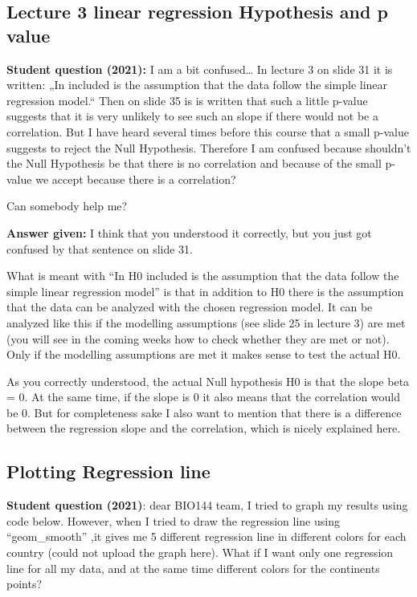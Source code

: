 \documentclass[
  letterpaper,
  8pt,
  a4paper]{book}
\begin{document}
\subsection*{Lecture 3 linear regression Hypothesis and p
value}\label{lecture-3-linear-regression-hypothesis-and-p-value}

\textbf{Student question (2021):} I am a bit confused\ldots{} In lecture
3 on slide 31 it is written: „In included is the assumption that the
data follow the simple linear regression model.`` Then on slide 35 is is
written that such a little p-value suggests that it is very unlikely to
see such an slope if there would not be a correlation. But I have heard
several times before this course that a small p-value suggests to reject
the Null Hypothesis. Therefore I am confused because shouldn't the Null
Hypothesis be that there is no correlation and because of the small
p-value we accept because there is a correlation?

Can somebody help me?

\textbf{Answer given:} I think that you understood it correctly, but you
just got confused by that sentence on slide 31.

What is meant with ``In H0 included is the assumption that the data
follow the simple linear regression model'' is that in addition to H0
there is the assumption that the data can be analyzed with the chosen
regression model. It can be analyzed like this if the modelling
assumptions (see slide 25 in lecture 3) are met (you will see in the
coming weeks how to check whether they are met or not). Only if the
modelling assumptions are met it makes sense to test the actual H0.

As you correctly understood, the actual Null hypothesis H0 is that the
slope beta = 0. At the same time, if the slope is 0 it also means that
the correlation would be 0. But for completeness sake I also want to
mention that there is a difference between the regression slope and the
correlation, which is nicely explained here.

\subsection*{Plotting Regression line}\label{plotting-regression-line}

\textbf{Student question (2021)}: dear BIO144 team, I tried to graph my
results using code below. However, when I tried to draw the regression
line using ``geom\_smooth'' ,it gives me 5 different regression line in
different colors for each country (could not upload the graph here).
What if I want only one regression line for all my data, and at the same
time different colors for the continents points?
\end{document}
